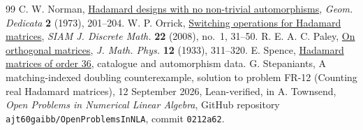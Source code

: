 \documentclass[11pt,reqno]{amsart}
\theoremstyle{remark}\newtheorem{remark}[theorem]{Remark}
\begin{document}
\begin{thebibliography}{99}
 C. W. Norman, \href{https://doi.org/10.1007/BF00147858}{Hadamard designs with no non-trivial automorphisms}, \emph{Geom. Dedicata} \textbf{2} (1973), 201--204.
 W. P. Orrick,
\href{https://arxiv.org/abs/math/0507515}{Switching operations for Hadamard matrices},
\emph{SIAM J. Discrete Math.} \textbf{22} (2008), no.~1, 31--50.
 R. E. A. C. Paley,
\href{https://doi.org/10.1002/sapm1933121311}{On orthogonal matrices},
\emph{J. Math. Phys.} \textbf{12} (1933), 311--320.
 E. Spence,
\href{https://www.maths.gla.ac.uk/~es/hadamard/hadamard.php}{Hadamard matrices of order 36}, catalogue and automorphism data.
 G. Stepaniants, A matching-indexed doubling counterexample, solution to problem FR-12 (Counting real Hadamard matrices), 12 September 2026, Lean-verified, in A. Townsend, \emph{Open Problems in Numerical Linear Algebra}, GitHub repository \texttt{ajt60gaibb/OpenProblemsInNLA}, commit \texttt{0212a62}.
\end{thebibliography}
\end{document}
